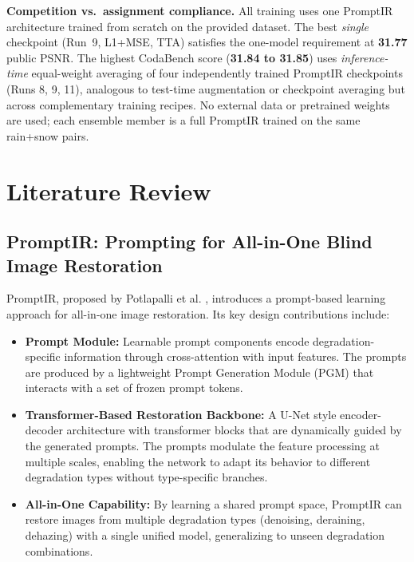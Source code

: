 \documentclass[12pt, a4paper]{article}
\begin{document}
\noindent\textbf{Competition vs.\ assignment compliance.} All training uses one PromptIR architecture trained from scratch on the provided dataset. The best \emph{single} checkpoint (Run~9, L1+MSE, TTA) satisfies the one-model requirement at \textbf{31.77} public PSNR. The highest CodaBench score (\textbf{31.84 to 31.85}) uses \emph{inference-time} equal-weight averaging of four independently trained PromptIR checkpoints (Runs 8, 9, 11), analogous to test-time augmentation or checkpoint averaging but across complementary training recipes. No external data or pretrained weights are used; each ensemble member is a full PromptIR trained on the same rain+snow pairs.

\section{Literature Review}

\subsection{PromptIR: Prompting for All-in-One Blind Image Restoration}
PromptIR, proposed by Potlapalli et al. \cite{potlapalli2023}, introduces a prompt-based learning approach for all-in-one image restoration. Its key design contributions include:

\begin{itemize}
    \item \textbf{Prompt Module:} Learnable prompt components encode degradation-specific information through cross-attention with input features. The prompts are produced by a lightweight Prompt Generation Module (PGM) that interacts with a set of frozen prompt tokens.
    \item \textbf{Transformer-Based Restoration Backbone:} A U-Net style encoder-decoder architecture with transformer blocks that are dynamically guided by the generated prompts. The prompts modulate the feature processing at multiple scales, enabling the network to adapt its behavior to different degradation types without type-specific branches.
    \item \textbf{All-in-One Capability:} By learning a shared prompt space, PromptIR can restore images from multiple degradation types (denoising, deraining, dehazing) with a single unified model, generalizing to unseen degradation combinations.
\end{itemize}
\end{document}
